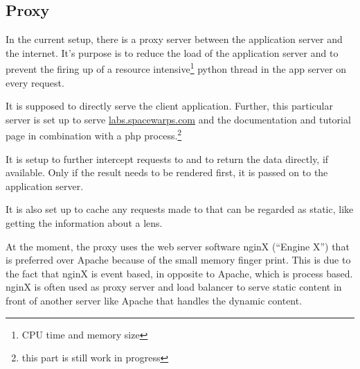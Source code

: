 \subsection{Proxy}
\label{sec:proxy}

In the current setup, there is a proxy server between the application server and the internet.
It's purpose is to reduce the load of the application server and to prevent the firing up of a resource intensive\footnote{CPU time and memory size} python thread in the app server on every request.

It is supposed to directly serve the client application. Further, this particular server is set up to serve \url{labs.spacewarps.com} and the \spl documentation and tutorial page in combination with a php process.\footnote{this part is still work in progress}

It is setup to further intercept requests to  and to return the data directly, if available.
Only if the result needs to be rendered first, it is passed on to the application server.

It is also set up to cache any requests made to  that can be regarded as static, like getting the information about a lens.

At the moment, the proxy uses the web server software nginX (``Engine X'') that is preferred over Apache because of the small memory finger print.
This is due to the fact that nginX is event based, in opposite to Apache, which is process based.
nginX is often used as proxy server and load balancer to serve static content in front of another server like Apache that handles the dynamic content.



